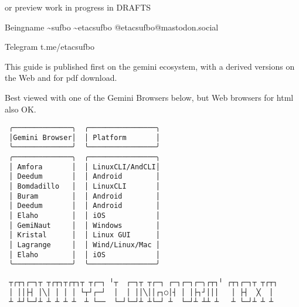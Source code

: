 \documentclass[
]{article}
\begin{document}
or preview work in progress in DRAFTS

Beingname \textasciitilde sufbo \textasciitilde etacsufbo
@etacsufbo@mastodon.social

Telegram t.me/etacsufbo

This guide is published first on the gemini ecosystem, with a derived
versions on the Web and for pdf download.

Best viewed with one of the Gemini Browsers below, but Web browsers for
html also OK.

\begin{verbatim}
 ╭──────────────╮  ╭────────────────╮ 
 │Gemini Browser│  │ Platform       │ 
 ╰──────────────╯  ╰────────────────╯ 
 ╭──────────────╮  ╭────────────────╮ 
 │ Amfora       │  │ LinuxCLI/AndCLI│ 
 │ Deedum       │  │ Android        │ 
 │ Bomdadillo   │  │ LinuxCLI       │ 
 │ Buram        │  │ Android        │ 
 │ Deedum       │  │ Android        │ 
 │ Elaho        │  │ iOS            │ 
 │ GemiNaut     │  │ Windows        │ 
 │ Kristal      │  │ Linux GUI      │ 
 │ Lagrange     │  │ Wind/Linux/Mac │ 
 │ Elaho        │  │ iOS            │ 
 ╰──────────────╯  ╰────────────────╯ 
\end{verbatim}

\begin{verbatim}
 ┬┌┬┐┌─┐┬ ┬┌┬┐┬┌┬┐┬ ┬┌─┐ ╵┬  ┌─┐┬ ┬┌─┐ ┌─┐┌─┐┌─╮┌┬┐╵ ┌┬┐┌─┐┬ ┬┌┬┐
 │ ││├┤ │╲│ │ │ │ └┬┘┌─┘  │  │ ││╲││┌┐○│┤ │ │├┐┘│││   │ ├┤  ╳  │
 ┴ ┴┘└─┘┴ ┴ ┴ ┴ ┴  ┴ └──  └─┘└─┘┴ ┴└─┘ ┴  └─┘┴ ┴┴ ┴   ┴ └─┘┴ ┴ ┴
\end{verbatim}
\end{document}
